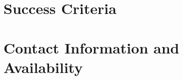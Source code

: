 \documentclass[11pt,a4paper]{article}
\begin{document}
\section{Success Criteria}

\section{Contact Information and Availability}
\end{document}
